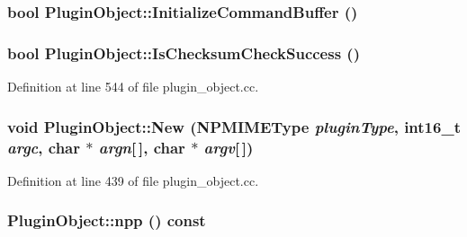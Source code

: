 \hypertarget{class_plugin_object_add4437ed89953c9617ef7bd07ae32194}{
\subsubsection[{InitializeCommandBuffer}]{\setlength{\rightskip}{0pt plus 5cm}bool PluginObject::InitializeCommandBuffer ()}}
\label{class_plugin_object_add4437ed89953c9617ef7bd07ae32194}
\hypertarget{class_plugin_object_a4f594d05bd890649ca0f87ce30f03d26}{
\subsubsection[{IsChecksumCheckSuccess}]{\setlength{\rightskip}{0pt plus 5cm}bool PluginObject::IsChecksumCheckSuccess ()}}
\label{class_plugin_object_a4f594d05bd890649ca0f87ce30f03d26}


Definition at line 544 of file plugin\_\-object.cc.

\hypertarget{class_plugin_object_a5e103c3aefcd2afb642c2414b92311ac}{
\subsubsection[{New}]{\setlength{\rightskip}{0pt plus 5cm}void PluginObject::New ({\bf NPMIMEType} {\em pluginType}, \/  int16\_\-t {\em argc}, \/  char $\ast$ {\em argn}\mbox{[}$\,$\mbox{]}, \/  char $\ast$ {\em argv}\mbox{[}$\,$\mbox{]})}}
\label{class_plugin_object_a5e103c3aefcd2afb642c2414b92311ac}


Definition at line 439 of file plugin\_\-object.cc.

\hypertarget{class_plugin_object_a1a051ee92618bae8134b4d273d1d9982}{
\subsubsection[{npp}]{ PluginObject::npp () const}}
\label{class_plugin_object_a1a051ee92618bae8134b4d273d1d9982}


